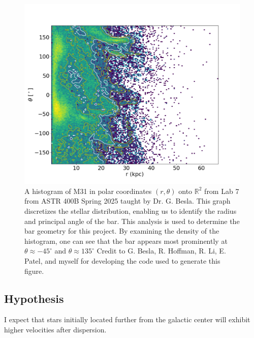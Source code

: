\documentclass[twocolumn]{aastex631}
\begin{document}
\begin{figure}[htbp]
  \includegraphics[width=1.0\textwidth]{Lab7_SpiralPhase}
  \caption{A histogram of M31 in polar coordinates $(r,\theta)$ onto
    $\mathbb{R}^2$ from Lab 7 from ASTR 400B Spring 2025 taught by
    Dr. G. Besla. This graph discretizes the stellar distribution,
    enabling us to identify the radius and principal angle of the
    bar. This analysis is used to determine the bar geometry for this
    project. By examining the density of the histogram, one can see
    that the bar appears most prominently at
    $\theta \approx -45^\circ$ and $\theta \approx 135^\circ$ Credit
    to G. Besla, R. Hoffman, R. Li, E. Patel, and myself for
    developing the code used to generate this figure.}
  \label{fig:spiral}
\end{figure}

\subsection{Hypothesis}
I expect that stars initially located further from the galactic center
will exhibit higher velocities after dispersion.



\end{document}
